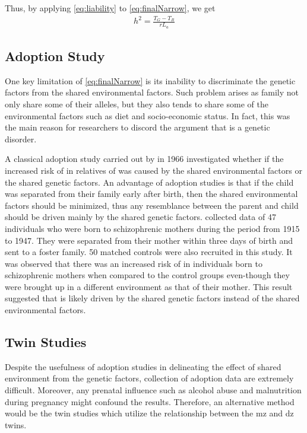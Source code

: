 	Thus, by applying \cref{eq:liability} to \cref{eq:finalNarrow}, we get
	\begin{align}
	h^2 =\frac{T_G-T_R}{rL_a}
	\end{align}
	
	\subsection{Adoption Study}
	One key limitation of \cref{eq:finalNarrow} is its inability to discriminate the genetic factors from the shared environmental factors.
	Such problem arises as family not only share some of their alleles, but they also tends to share some of the environmental factors such as diet and socio-economic status. 
	In fact, this was the main reason for researchers to discord the argument that  is a genetic disorder.
	
	A classical adoption study carried out by \citet{HESTON1966} in 1966 investigated whether if the increased risk of  in relatives of  was caused by the shared environmental factors or the shared genetic factors. 
	An advantage of adoption studies is that if the child was separated from their family early after birth, then the shared environmental factors should be minimized, thus any resemblance between the parent and child should be driven mainly by the shared genetic factors.
	\citet{HESTON1966} collected data of 47 individuals who were born to schizophrenic mothers during the period from 1915 to 1947. 
	They were separated from their mother within three days of birth and sent to a foster family. 
	50 matched controls were also recruited in this study.
	It was observed that there was an increased risk of  in individuals born to schizophrenic mothers when compared to the control groups even-though they were brought up in a different environment as that of their mother.
	This result suggested that  is likely driven by the shared genetic factors instead of the shared environmental factors.
	
	\subsection{Twin Studies}
	Despite the usefulness of adoption studies in delineating the effect of shared environment from the genetic factors, collection of adoption data are extremely difficult. 
	Moreover, any prenatal influence such as alcohol abuse and malnutrition during pregnancy might confound the results.
	Therefore, an alternative method would be the twin studies which utilize the relationship between the \gls{mz} and \gls{dz} twins.
	
